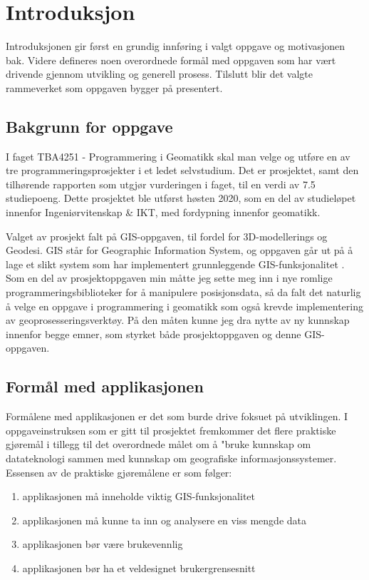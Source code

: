 \chapter{Introduksjon}
Introduksjonen gir først en grundig innføring i valgt oppgave og motivasjonen bak. Videre defineres noen overordnede formål med oppgaven som har vært drivende gjennom utvikling og generell prosess. Tilslutt blir det valgte rammeverket som oppgaven bygger på presentert.

\section{Bakgrunn for oppgave}
I faget TBA4251 - Programmering i Geomatikk skal man velge og utføre en av tre programmeringsprosjekter i et ledet selvstudium. Det er prosjektet, samt den tilhørende rapporten som utgjør vurderingen i faget, til en verdi av 7.5 studiepoeng. Dette prosjektet ble utførst høsten 2020, som en del av studieløpet innenfor Ingeniørvitenskap \& IKT, med fordypning innenfor geomatikk. 

Valget av prosjekt falt på GIS-oppgaven, til fordel for 3D-modellerings og Geodesi. GIS står for Geographic Information System, og oppgaven går ut på å lage et slikt system som har implementert grunnleggende GIS-funksjonalitet \cite{midtbøa}. Som en del av prosjektoppgaven min måtte jeg sette meg inn i nye romlige programmeringsbiblioteker for å manipulere posisjonsdata, så da falt det naturlig å velge en oppgave i programmering i geomatikk som også krevde implementering av geoprosesseringsverktøy. På den måten kunne jeg dra nytte av ny kunnskap innenfor begge emner, som styrket både prosjektoppgaven og denne GIS-oppgaven. 

\section{Formål med applikasjonen}

Formålene med applikasjonen er det som burde drive foksuet på utviklingen. I oppgaveinstruksen som er gitt til prosjektet \cite{midtbøa} fremkommer det flere praktiske gjøremål i tillegg til det overordnede målet om å "bruke kunnskap om datateknologi sammen med kunnskap om geografiske informasjonssystemer. Essensen av de praktiske gjøremålene er som følger: 

\begin{enumerate}
    \item applikasjonen må inneholde viktig GIS-funksjonalitet
    \item applikasjonen må kunne ta inn og analysere en viss mengde data
    \item applikasjonen bør være brukevennlig
    \item applikasjonen bør ha et veldesignet brukergrensesnitt
\end{enumerate}

